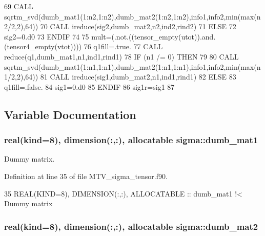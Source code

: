 \begin{DoxyCode}
69        \textcolor{keyword}{CALL }sqrtm\_svd(dumb\_mat1(1:n2,1:n2),dumb\_mat2(1:n2,1:n2),info1,info2,min(max(n2/2,2),64))
70        \textcolor{keyword}{CALL }ireduce(sig2,dumb\_mat2,n2,ind2,rind2)
71     \textcolor{keywordflow}{ELSE}
72        sig2=0.d0
73 \textcolor{keywordflow}{    ENDIF}
74 
75     mult=(.not.((tensor\_empty(utot)).and.(tensor4\_empty(vtot))))
76     q1fill=.true.
77     \textcolor{keyword}{CALL }reduce(q1,dumb\_mat1,n1,ind1,rind1)
78     \textcolor{keywordflow}{IF} (n1 /= 0) \textcolor{keywordflow}{THEN}
79        
80        \textcolor{keyword}{CALL }sqrtm\_svd(dumb\_mat1(1:n1,1:n1),dumb\_mat2(1:n1,1:n1),info1,info2,min(max(n1/2,2),64))
81        \textcolor{keyword}{CALL }ireduce(sig1,dumb\_mat2,n1,ind1,rind1)
82     \textcolor{keywordflow}{ELSE}
83        q1fill=.false.
84        sig1=0.d0
85 \textcolor{keywordflow}{    ENDIF}
86     sig1r=sig1
87 
\end{DoxyCode}


\subsection{Variable Documentation}
\subsubsection[{\texorpdfstring{dumb\+\_\+mat1}{dumb_mat1}}]{\setlength{\rightskip}{0pt plus 5cm}real(kind=8), dimension(\+:,\+:), allocatable sigma\+::dumb\+\_\+mat1\hspace{0.3cm}{\ttfamily [private]}}\hypertarget{namespacesigma_ab1b904a05acf6ebc4f8a35ad55f5b9b6}{}\label{namespacesigma_ab1b904a05acf6ebc4f8a35ad55f5b9b6}


Dummy matrix. 



Definition at line 35 of file M\+T\+V\+\_\+sigma\+\_\+tensor.\+f90.


\begin{DoxyCode}
35   \textcolor{keywordtype}{REAL(KIND=8)}, \textcolor{keywordtype}{DIMENSION(:,:)}, \textcolor{keywordtype}{ALLOCATABLE} :: dumb\_mat1\textcolor{comment}{ !< Dummy matrix}
\end{DoxyCode}
\subsubsection[{\texorpdfstring{dumb\+\_\+mat2}{dumb_mat2}}]{\setlength{\rightskip}{0pt plus 5cm}real(kind=8), dimension(\+:,\+:), allocatable sigma\+::dumb\+\_\+mat2\hspace{0.3cm}{\ttfamily [private]}}\hypertarget{namespacesigma_a74726cc22665d4fde608f992a262f04e}{}\label{namespacesigma_a74726cc22665d4fde608f992a262f04e}


